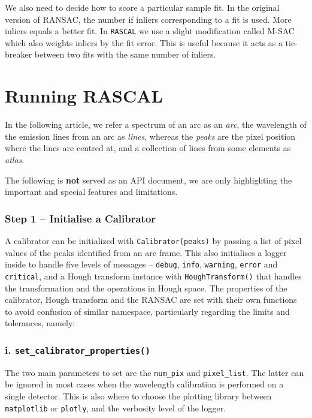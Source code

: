 \documentclass[fleqn,usenatbib]{rasti}
\begin{document}
We also need to decide how to score a particular sample fit. In the original
version of RANSAC, the number if inliers corresponding to a fit is used. More
inliers equals a better fit. In \texttt{RASCAL} we use a slight modification called
M-SAC~\citep{Torr00mlesac:a} which also weights inliers by the fit error.
This is useful because it acts as a tie-breaker between two fits with the
same number of inliers.

\section{Running RASCAL}
In the following article, we refer a spectrum of an arc as an \textit{arc},
the wavelength of the emission lines from an arc as \textit{lines}, whereas 
the \textit{peaks} are the pixel position where the lines are centred at,
and a collection of lines from some elements as \textit{atlas}.

The following is \textbf{not} served as an API document, we are only highlighting
the important and special features and limitations.

\subsubsection*{Step 1 -- Initialise a Calibrator}
A calibrator can be initialized with \texttt{Calibrator(peaks)} by passing a list
of pixel values of the peaks identified from an arc frame. This also
initialises a logger inside to handle five levels of messages -- \texttt{debug},
\texttt{info}, \texttt{warning}, \texttt{error} and \texttt{critical}, and a
Hough transform instance with \texttt{HoughTransform()} that handles the
transformation and the operations in Hough space. The properties of the
calibrator, Hough transform and the RANSAC are set with their own functions to
avoid confusion of similar namespace, particularly regarding the limits and
tolerances, namely:

\subsubsection*{i. \texttt{set\_calibrator\_properties()}}
The two main parameters to set are the \texttt{num\_pix} and \texttt{pixel\_list}.
The latter can be ignored in most cases when the wavelength calibration is performed
on a single detector. This is also where to choose the plotting library between
\texttt{matplotlib} or \texttt{plotly}, and the verbosity level of the logger.
\end{document}
